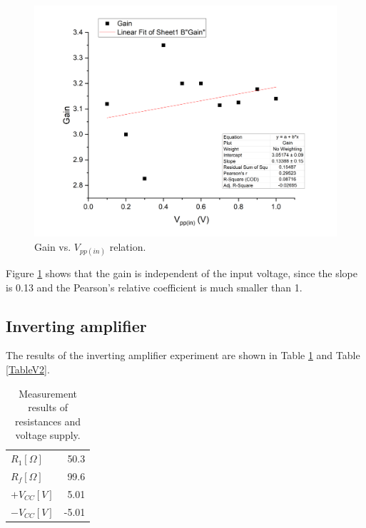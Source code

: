 \documentclass{article}
\begin{document}
\begin{figure}[H]
\centering
\includegraphics[scale=0.4]{plot2.png}
\caption{Gain vs. $V_{pp(in)}$ relation.}\label{FigG1}
\end{figure}

Figure \ref{FigG1} shows that the gain is independent of the input voltage, since the slope is 0.13 and the Pearson's relative coefficient is much smaller than 1.


	\subsection{Inverting amplifier}

The results of the inverting amplifier experiment are shown in Table \ref{TableO2} and Table \ref{TableV2}.

\begin{table}[H]
\centering
\begin{tabular}{lr}
\toprule
$R_1[\Omega]$ & 50.3\\
$R_f[\Omega]$ & 99.6\\
\midrule
$+V_{CC}[V]$ & 5.01\\
$-V_{CC}[V]$ & -5.01\\
\bottomrule
\end{tabular}
\caption{Measurement results of resistances and voltage supply.}\label{TableO2}
\end{table}
\end{document}
